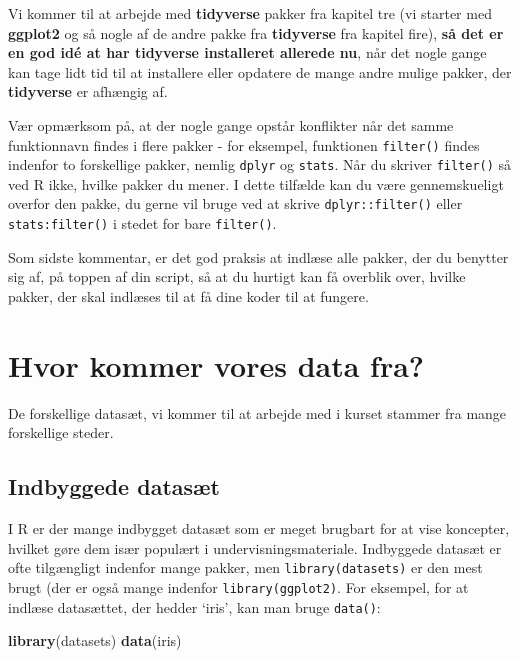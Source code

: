 \documentclass[
]{book}
\newenvironment{Shaded}{\begin{snugshade}}{\end{snugshade}}
\newcommand{\FunctionTok}[1]{\textcolor[rgb]{0.13,0.29,0.53}{\textbf{#1}}}
\newcommand{\NormalTok}[1]{#1}
\theoremstyle{definition}
\theoremstyle{definition}
\theoremstyle{definition}
\theoremstyle{definition}
\theoremstyle{remark}
\begin{document}
Vi kommer til at arbejde med \textbf{tidyverse} pakker fra kapitel tre (vi starter med \textbf{ggplot2} og så nogle af de andre pakke fra \textbf{tidyverse} fra kapitel fire), \textbf{så det er en god idé at har tidyverse installeret allerede nu}, når det nogle gange kan tage lidt tid til at installere eller opdatere de mange andre mulige pakker, der \textbf{tidyverse} er afhængig af.

Vær opmærksom på, at der nogle gange opstår konflikter når det samme funktionnavn findes i flere pakker - for eksempel, funktionen \texttt{filter()} findes indenfor to forskellige pakker, nemlig \texttt{dplyr} og \texttt{stats}. Når du skriver \texttt{filter()} så ved R ikke, hvilke pakker du mener. I dette tilfælde kan du være gennemskueligt overfor den pakke, du gerne vil bruge ved at skrive \texttt{dplyr::filter()} eller \texttt{stats:filter()} i stedet for bare \texttt{filter()}.

Som sidste kommentar, er det god praksis at indlæse alle pakker, der du benytter sig af, på toppen af din script, så at du hurtigt kan få overblik over, hvilke pakker, der skal indlæses til at få dine koder til at fungere.

\section{Hvor kommer vores data fra?}\label{hvor-kommer-vores-data-fra}

De forskellige datasæt, vi kommer til at arbejde med i kurset stammer fra mange forskellige steder.

\subsection{Indbyggede datasæt}\label{indbyggede-datasuxe6t}

I R er der mange indbygget datasæt som er meget brugbart for at vise koncepter, hvilket gøre dem især populært i undervisningsmateriale. Indbyggede datasæt er ofte tilgængligt indenfor mange pakker, men \texttt{library(datasets)} er den mest brugt (der er også mange indenfor \texttt{library(ggplot2)}. For eksempel, for at indlæse datasættet, der hedder `iris', kan man bruge \texttt{data()}:

\begin{Shaded}
\begin{Highlighting}[]
\FunctionTok{library}\NormalTok{(datasets)}
\FunctionTok{data}\NormalTok{(iris)}
\end{Highlighting}
\end{Shaded}
\end{document}
